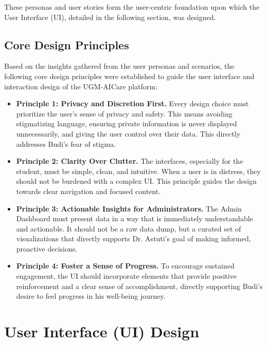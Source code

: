 These personas and user stories form the user-centric foundation upon which the User Interface (UI), detailed in the following section, was designed.

\subsection{Core Design Principles}

Based on the insights gathered from the user personas and scenarios, the following core design principles were established to guide the user interface and interaction design of the UGM-AICare platform:

\begin{itemize}
    \item \textbf{Principle 1: Privacy and Discretion First.} Every design choice must prioritize the user's sense of privacy and safety. This means avoiding stigmatizing language, ensuring private information is never displayed unnecessarily, and giving the user control over their data. This directly addresses Budi's fear of stigma.
    \item \textbf{Principle 2: Clarity Over Clutter.} The interfaces, especially for the student, must be simple, clean, and intuitive. When a user is in distress, they should not be burdened with a complex UI. This principle guides the design towards clear navigation and focused content.
    \item \textbf{Principle 3: Actionable Insights for Administrators.} The Admin Dashboard must present data in a way that is immediately understandable and actionable. It should not be a raw data dump, but a curated set of visualizations that directly supports Dr. Astuti's goal of making informed, proactive decisions.
    \item \textbf{Principle 4: Foster a Sense of Progress.} To encourage sustained engagement, the UI should incorporate elements that provide positive reinforcement and a clear sense of accomplishment, directly supporting Budi's desire to feel progress in his well-being journey.
\end{itemize}


\section{User Interface (UI) Design}

